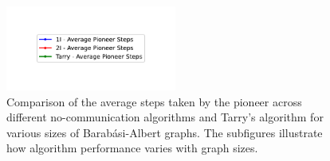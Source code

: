 \begin{figure}[H]
    \centering
    \qquad
    \qquad
    \includegraphics[width=0.5\textwidth]{Cap3/no_comm_steps_legend.pdf}
    \newline
    \qquad
    \newline
    \qquad
    \caption{Comparison of the average steps taken by the pioneer across different no-communication algorithms and Tarry's algorithm for various sizes of Barabási-Albert graphs. The subfigures illustrate how algorithm performance varies with graph sizes.}
    \label{fig_no_comm_steps_all_sizes_barabasi}
\end{figure}

